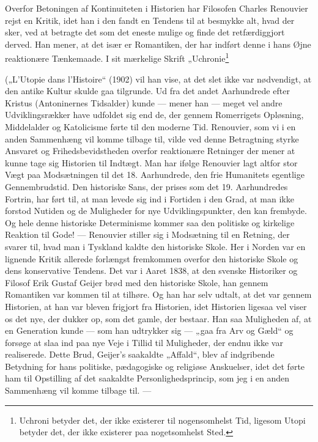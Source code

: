 \documentclass[12pt,a4paper,openany]{book}
\newcommand{\opage}[1]{\marginnote{\footnotesize\textit{[#1]}}}
\newcommand{\starnote}[1]{\begingroup\renewcommand\thefootnote{*)}\footnote{#1}\addtocounter{footnote}{-1}\endgroup}
\begin{document}
Overfor Betoningen af Kontinuiteten i Historien har Filosofen
Charles Renouvier rejst en Kritik, idet han i den fandt en Tendens
til at besmykke alt, hvad der sker, ved at betragte det som det
eneste mulige og finde det retfærdiggjort derved. Han mener, at det
især er Romantiken, der har indført denne i hans Øjne reaktionære
\opage{61}Tænkemaade. I sit mærkelige Skrift „Uchronie\starnote{Uchroni betyder det, der ikke existerer til nogensomhelst Tid, ligesom Utopi betyder det, der ikke existerer paa nogetsomhelst Sted.} („L’Utopie dans
l’Histoire“ (1902) vil han vise, at det slet ikke var nødvendigt, at den
antike Kultur skulde gaa tilgrunde. Ud fra det andet Aarhundrede efter
Kristus (Antoninernes Tidsalder) kunde --- mener han --- meget vel
andre Udviklingsrækker have udfoldet sig end de, der gennem Romerrigets
Opløsning, Middelalder og Katolicisme førte til den moderne
Tid. Renouvier, som vi i en anden Sammenhæng vil komme tilbage
til, vilde ved denne Betragtning styrke Ansvaret og Frihedsbevidstheden
overfor reaktionære Retninger der mener at kunne tage sig
Historien til Indtægt. Man har ifølge Renouvier lagt altfor stor Vægt
paa Modsætningen til det 18. Aarhundrede, den frie Humanitets
egentlige Gennembrudstid. Den historiske Sans, der prises som det
19. Aarhundredes Fortrin, har ført til, at man levede sig ind i Fortiden
i den Grad, at man ikke forstod Nutiden og de Muligheder for
nye Udviklingspunkter, den kan frembyde. Og hele denne historiske
Determinisme kommer saa den politiske og kirkelige Reaktion til
Gode! --- Renouvier stiller sig i Modsætning til en Retning, der svarer
til, hvad man i Tyskland kaldte den historiske Skole. Her i
Norden var en lignende Kritik allerede forlængst fremkommen overfor
den historiske Skole og dens konservative Tendens. Det var i
Aaret 1838, at den svenske Historiker og Filosof Erik Gustaf Geijer
brød med den historiske Skole, han gennem Romantiken var kommen
til at tilhøre. Og han har selv udtalt, at det var gennem Historien,
at han var bleven frigjort fra Historien, idet Historien ligesaa
vel viser os det nye, der dukker op, som det gamle, der bestaar. Han
saa Muligheden af, at en Generation kunde --- som han udtrykker
sig --- „gaa fra Arv og Gæld“ og forsøge at slaa ind paa nye Veje i
Tillid til Muligheder, der endnu ikke var realiserede. Dette Brud,
Geijer’s saakaldte „Affald“, blev af indgribende Betydning for hans
politiske, pædagogiske og religiøse Anskuelser, idet det førte ham
til Opstilling af det saakaldte Personlighedsprincip, som jeg i en
anden Sammenhæng vil komme tilbage til. ---
\end{document}
